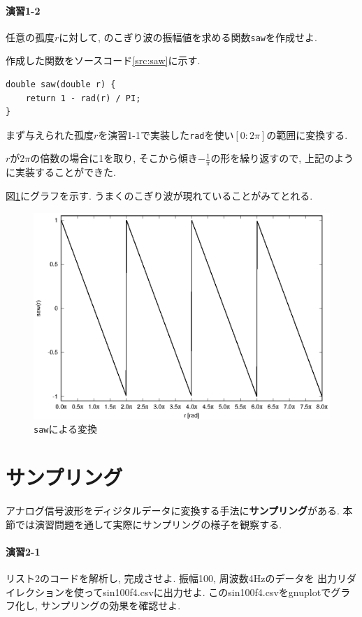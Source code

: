 \documentclass[titlepage]{jsarticle}
\begin{document}
    \paragraph{演習1-2} 任意の孤度$r$に対して, のこぎり波の振幅値を求める関数\verb|saw|を作成せよ.

        作成した関数をソースコード\ref{src:saw}に示す.

        \begin{lstlisting}[caption=saw.c, label=src:saw]
double saw(double r) {
    return 1 - rad(r) / PI;
}\end{lstlisting}

        まず与えられた孤度$r$を演習1-1で実装した\verb|rad|を使い$[0:2\pi]$の範囲に変換する.

        $r$が$2\pi$の倍数の場合に1を取り, そこから傾き$-\frac{1}{\pi}$の形を繰り返すので,
        上記のように実装することができた.

        図\ref{fig:saw}にグラフを示す. うまくのこぎり波が現れていることがみてとれる.

        \begin{figure}[ht]
            \centering
            \includegraphics[width=12cm]{images/saw.eps}
            \cprotect\caption{\verb|saw|による変換}
            \label{fig:saw}
        \end{figure}

\section{サンプリング}
    アナログ信号波形をディジタルデータに変換する手法に\textbf{サンプリング}がある.
    本節では演習問題を通して実際にサンプリングの様子を観察する.

    \paragraph{演習2-1} リスト2のコードを解析し, 完成させよ. 振幅100, 周波数4Hzのデータを
    出力リダイレクションを使ってsin100f4.csvに出力せよ. このsin100f4.csvをgnuplotでグラフ化し,
    サンプリングの効果を確認せよ.
\end{document}
